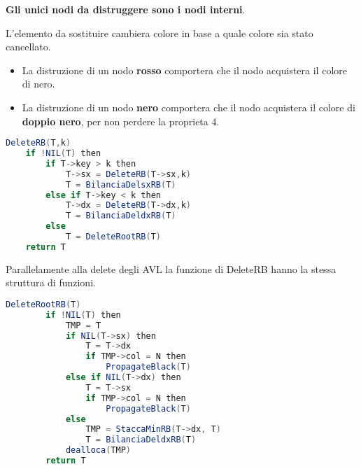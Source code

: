 \textbf{Gli unici nodi da distruggere sono i nodi interni}.

L'elemento da sostituire cambiera colore in base a quale colore sia stato cancellato.

\begin{itemize}
	\item La distruzione di un nodo \textbf{rosso} comportera che il nodo acquistera il colore di nero.
	\item La distruzione di un nodo \textbf{nero} comportera che il nodo acquistera il colore di \textbf{doppio nero}, per non perdere la proprieta 4.
\end{itemize}

\begin{lstlisting}[language=Java]
	DeleteRB(T,k)
	if !NIL(T) then
		if T->key > k then
			T->sx = DeleteRB(T->sx,k)
			T = BilanciaDelsxRB(T)
		else if T->key < k then
			T->dx = DeleteRB(T->dx,k)
			T = BilanciaDeldxRB(T)
		else 
			T = DeleteRootRB(T)
	return T
\end{lstlisting}

Parallelamente alla delete degli AVL la funzione di DeleteRB hanno la stessa struttura di funzioni.

\begin{lstlisting}[language=Java]
	DeleteRootRB(T)
		if !NIL(T) then
			TMP = T
			if NIL(T->sx) then
				T = T->dx
				if TMP->col = N then	
					PropagateBlack(T)
			else if NIL(T->dx) then
				T = T->sx
				if TMP->col = N then
					PropagateBlack(T)
			else
				TMP = StaccaMinRB(T->dx, T)
				T = BilanciaDeldxRB(T)
			dealloca(TMP)
		return T
\end{lstlisting}